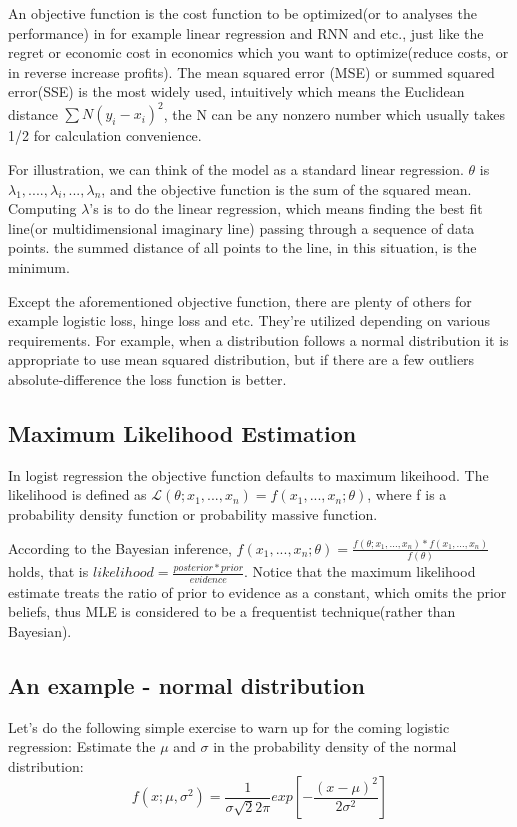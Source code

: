\documentclass[a4paper]{article}
\begin{document}
An objective function is the cost function to be optimized(or to analyses the performance) in for example linear regression and RNN and etc., just like the regret or economic cost in economics which you want to optimize(reduce costs, or in reverse increase profits). The mean squared error (MSE) or summed squared error(SSE) is the most widely used, intuitively which means the Euclidean distance $\sum N (y_i - x_i)^2$, the N can be any nonzero number which usually takes 1/2 for calculation convenience.    

For illustration, we can think of the model as a standard linear regression. $\theta$ is $\lambda_1,....,\lambda_i,...,\lambda_n$, and the objective function is the sum of the squared mean. Computing $\lambda$'s is to do the linear regression, which means finding the best fit line(or multidimensional imaginary line) passing through a sequence of data points. the summed distance of all points to the line, in this situation, is the minimum.      

Except the aforementioned objective function, there are plenty of others for example logistic loss, hinge loss and etc. They're utilized depending on various requirements. For example, when a distribution follows a normal distribution it is appropriate to use mean squared distribution, but if there are a few outliers absolute-difference the loss function is better.    

\subsection{Maximum Likelihood Estimation}
In logist regression the objective function defaults to maximum likeihood. The likelihood is defined as $\mathcal{L}(\theta; x_1,...,x_n) = f(x_1,...,x_n; \theta)$, where f is a probability density function or probability massive function. 

According to the Bayesian inference, $f(x_1,...,x_n; \theta) = \frac{f(\theta; x_1,...,x_n) * f(x_1,...,x_n)}{f(\theta)}$ holds, that is $likelihood = \frac{posterior * prior}{evidence}$. Notice that the maximum likelihood estimate treats the ratio of prior to evidence as a constant, which omits the prior beliefs, thus MLE is considered to be a frequentist technique(rather than Bayesian).   

\subsection{An example - normal distribution}
Let's do the following simple exercise to warn up for the coming logistic regression:
Estimate the $\mu$ and $\sigma$ in the probability density of the normal distribution:
$$f(x; \mu, \sigma^2) = \frac{1}{\sigma\sqrt{2}{2\pi}}exp[-\frac{(x-\mu)^2}{2\sigma^2}]$$
\end{document}
